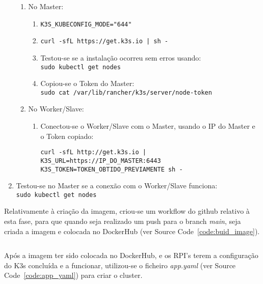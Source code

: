 \begin{enumerate}
        \begin{enumerate}
            \item No Master:

            \begin{enumerate}
                \item \texttt{K3S_KUBECONFIG_MODE="644"}
                \item \texttt{curl -sfL https://get.k3s.io | sh -}
                \item Testou-se se a instalação ocorreu sem erros usando:\\
                    \texttt{sudo kubectl get nodes}
                \item Copiou-se o Token do Master:\\
                    \texttt{sudo cat /var/lib/rancher/k3s/server/node-token}
            \end{enumerate}

            \item No Worker/Slave:

            \begin{enumerate}
                \item Conectou-se o Worker/Slave com o Master, usando o IP do Master e o Token copiado:

                \begin{verbatim}
curl -sfL http://get.k3s.io | K3S_URL=https://IP_DO_MASTER:6443 K3S_TOKEN=TOKEN_OBTIDO_PREVIAMENTE sh -
                \end{verbatim}

            \end{enumerate}
        \end{enumerate}

        \item Testou-se no Master se a conexão com o Worker/Slave funciona:\\
            \texttt{sudo kubectl get nodes}

    \end{enumerate}

    \par Relativamente à criação da imagem, criou-se um workflow do github relativo à esta fase, para que quando seja realizado um push para o branch \emph{main}, seja criada a imagem e colocada no DockerHub (ver Source Code~\ref{code:buid_image}).

        \begin{code}
            \inputminted[linenos,breaklines,tabsize=1,firstline=19,lastline=24]{yaml}{../.github/workflows/project-workflow-fase-2.yml}

            \label{code:buid_image}
        \end{code}

    \par Após a imagem ter sido colocada no DockerHub, e os RPI's terem a configuração do K3s concluída e a funcionar, utilizou-se o ficheiro \emph{app.yaml} (ver Source Code~\ref{code:app_yaml}) para criar o cluster.
